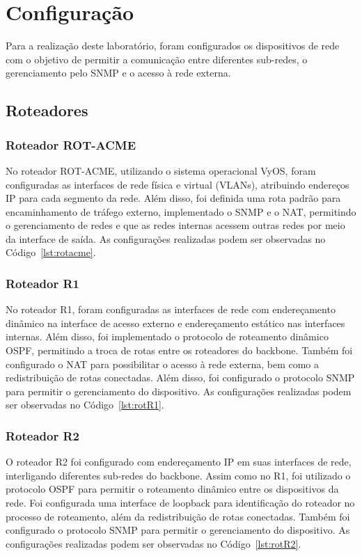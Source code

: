 \section{Configuração}

Para a realização deste laboratório, foram configurados os dispositivos de rede com o objetivo de permitir a comunicação entre diferentes sub-redes, o gerenciamento pelo SNMP e o acesso à rede externa.

\subsection{Roteadores}
\subsubsection{Roteador ROT-ACME}

No roteador ROT-ACME, utilizando o sistema operacional VyOS, foram configuradas as interfaces de rede física e virtual (VLANs), atribuindo endereços IP para cada segmento da rede. Além disso, foi definida uma rota padrão para encaminhamento de tráfego externo, implementado o SNMP e o NAT, permitindo o gerenciamento de redes e que as redes internas acessem outras redes por meio da interface de saída. As configurações realizadas podem ser observadas no Código~\ref{lst:rotacme}.

\subsubsection{Roteador R1}

No roteador R1, foram configuradas as interfaces de rede com endereçamento dinâmico na interface de acesso externo e endereçamento estático nas interfaces internas. Além disso, foi implementado o protocolo de roteamento dinâmico OSPF, permitindo a troca de rotas entre os roteadores do backbone. Também foi configurado o NAT para possibilitar o acesso à rede externa, bem como a redistribuição de rotas conectadas. Além disso, foi configurado o protocolo SNMP para permitir o gerenciamento do dispositivo. As configurações realizadas podem ser observadas no Código~\ref{lst:rotR1}.

\subsubsection{Roteador R2}
O roteador R2 foi configurado com endereçamento IP em suas interfaces de rede, interligando diferentes sub-redes do backbone. Assim como no R1, foi utilizado o protocolo OSPF para permitir o roteamento dinâmico entre os dispositivos da rede. Foi configurada uma interface de loopback para identificação do roteador no processo de roteamento, além da redistribuição de rotas conectadas. Também foi configurado o protocolo SNMP para permitir o gerenciamento do dispositivo. As configurações realizadas podem ser observadas no Código~\ref{lst:rotR2}.

